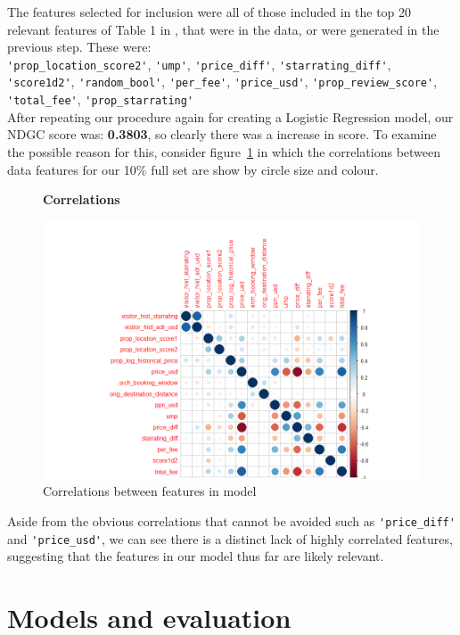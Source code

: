 \documentclass{llncs}
\begin{document}
 The features selected for inclusion were all of those included in the top 20 relevant features of Table 1 in \cite{DBLP:journals/corr/LiuXZYPLSW13}, that were in the data, or were generated in the previous step. These were:\\ \verb!'prop_location_score2'!, \verb!'ump'!, \verb!'price_diff'!, \verb!'starrating_diff'!, \verb!'score1d2'!, \verb!'random_bool'!, \verb!'per_fee'!, \verb!'price_usd'!, \verb!'prop_review_score'!, \verb!'total_fee'!, \verb!'prop_starrating'!
\\
After repeating our procedure again for creating a Logistic Regression model, our NDGC score was: \textbf{0.3803}, so clearly there was a increase in score. To examine the possible reason for this, consider figure~\ref{fig:corr} in which the correlations between data features for our 10\% full set are show by circle size and colour.

	\begin{figure}
	\centering
	\textbf{Correlations}\par\medskip
		\includegraphics[scale=0.3]{figures/corr_plot.png}
	\caption{Correlations between features in model}
	\label{fig:corr}
	\end{figure}

Aside from the obvious correlations that cannot be avoided such as \verb!'price_diff'! and \verb!'price_usd'!, we can see there is a distinct lack of highly correlated features, suggesting that the features in our model thus far are likely relevant. 


\section{Models and evaluation}
\end{document}
